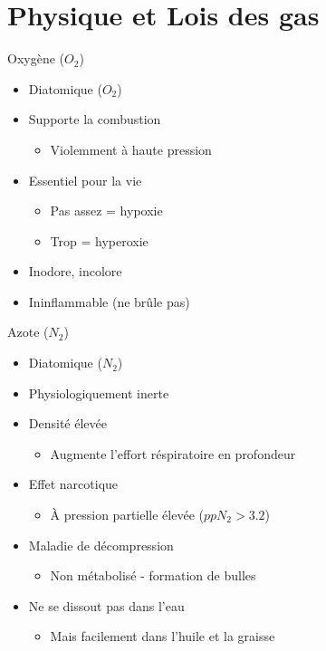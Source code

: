 
\section{Physique et Lois des gas}

\begin{frame}{Oxygène ($O_2$)}
	\begin{itemize}
		\item Diatomique ($O_2$)
		\item Supporte la combustion
		\begin{itemize}
			\item Violemment à haute pression
		\end{itemize}
		\item Essentiel pour la vie
		\begin{itemize}
			\item Pas assez = hypoxie
			\item Trop = hyperoxie
		\end{itemize}
		\item Inodore, incolore
		\item Ininflammable (ne brûle pas)
	\end{itemize}
\end{frame}

\begin{frame}{Azote ($N_2$)}
	\begin{itemize}
		\item Diatomique ($N_2$)
		\item Physiologiquement inerte
		\item Densité élevée
		\begin{itemize}\item Augmente l'effort réspiratoire en profondeur\end{itemize}
		\item Effet narcotique
		\begin{itemize}\item À pression partielle élevée ($ppN_2 > 3.2$)\end{itemize}
		\item Maladie de décompression
		\begin{itemize}\item Non métabolisé - formation de bulles\end{itemize}
		\item Ne se dissout pas dans l'eau
		\begin{itemize}\item Mais facilement dans l'huile et la graisse\end{itemize}
	\end{itemize}
\end{frame}

